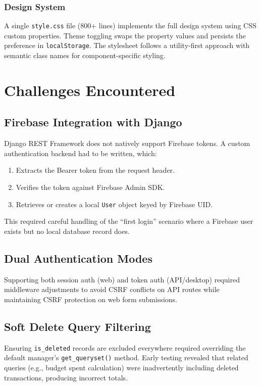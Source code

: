 \documentclass[12pt,a4paper]{article}
\begin{document}
\subsubsection{Design System}
A single \texttt{style.css} file (800+ lines) implements the full design system using CSS custom properties.
Theme toggling swaps the property values and persists the preference in \texttt{localStorage}.
The stylesheet follows a utility-first approach with semantic class names for component-specific styling.

\section{Challenges Encountered}

\subsection{Firebase Integration with Django}
Django REST Framework does not natively support Firebase tokens.
A custom authentication backend had to be written, which:
\begin{enumerate}
  \item Extracts the Bearer token from the request header.
  \item Verifies the token against Firebase Admin SDK.
  \item Retrieves or creates a local \texttt{User} object keyed by Firebase UID.
\end{enumerate}
This required careful handling of the ``first login'' scenario where a Firebase user exists but no local database record does.

\subsection{Dual Authentication Modes}
Supporting both session auth (web) and token auth (API/desktop) required middleware adjustments to avoid CSRF conflicts on API routes while maintaining CSRF protection on web form submissions.

\subsection{Soft Delete Query Filtering}
Ensuring \texttt{is\_deleted} records are excluded everywhere required overriding the default manager's \texttt{get\_queryset()} method.
Early testing revealed that related queries (e.g., budget spent calculation) were inadvertently including deleted transactions, producing incorrect totals.
\end{document}
